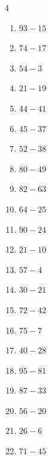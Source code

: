 \begin{multicols}{4}
\begin{enumerate}
  \item $93-15$
        \phantom{$=78$}

  \item $74-17$
        \phantom{$=57$}

  \item $54-3$
        \phantom{$=51$}

  \item $21-19$
        \phantom{$=2$}

  \item $44-41$
        \phantom{$=3$}

  \item $45-37$
        \phantom{$=8$}

  \item $52-38$
        \phantom{$=14$}

  \item $80-49$
        \phantom{$=31$}

  \item $82-63$
        \phantom{$=19$}

  \item $64-25$
        \phantom{$=39$}

  \item $90-24$
        \phantom{$=66$}

  \item $21-10$
        \phantom{$=11$}

  \item $57-4$
        \phantom{$=53$}

  \item $30-21$
        \phantom{$=9$}

  \item $72-42$
        \phantom{$=30$}

  \item $75-7$
        \phantom{$=68$}

\columnbreak %

  \item $40-28$
        \phantom{$=12$}

  \item $95-81$
        \phantom{$=14$}

  \item $87-33$
        \phantom{$=54$}

  \item $56-20$
        \phantom{$=36$}

  \item $26-6$
        \phantom{$=20$}

  \item $71-45$
        \phantom{$=26$}


\end{enumerate}
\end{multicols}
